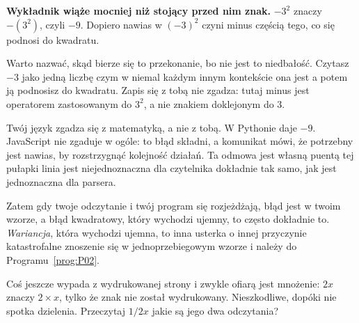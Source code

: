 \begin{fr}
\begin{trapbox}
\textbf{Wykładnik wiąże mocniej niż stojący przed nim znak.} $-3^{2}$ znaczy
$-(3^{2})$, czyli $-9$. Dopiero nawias w $(-3)^{2}$ czyni minus częścią tego,
co się podnosi do kwadratu.

Warto nazwać, skąd bierze się to przekonanie, bo nie jest to niedbałość.
Czytasz $-3$ jako jedną liczbę \dash{} czym w niemal każdym innym kontekście
ona jest \dash{} a potem ją podnosisz do kwadratu. Zapis się z tobą nie zgadza:
tutaj minus jest operatorem zastosowanym do $3^{2}$, a nie znakiem doklejonym
do $3$.

Twój język zgadza się z matematyką, a nie z tobą. W Pythonie  daje
$-9$. JavaScript nie zgaduje w ogóle:  to błąd składni, a
komunikat mówi, że potrzebny jest nawias, by rozstrzygnąć kolejność działań. Ta
odmowa jest własną puentą tej pułapki \dash{} linia jest niejednoznaczna dla
czytelnika dokładnie tak samo, jak jest jednoznaczna dla parsera.

Zatem gdy twoje odczytanie i twój program się rozjeżdżają, błąd jest w twoim
wzorze, a błąd kwadratowy, który wychodzi ujemny, to często dokładnie
to. \emph{Wariancja}, która wychodzi ujemna, to inna usterka o innej
przyczynie \dash{} katastrofalne znoszenie się w jednoprzebiegowym wzorze
\dash{} i należy do Programu~\ref{prog:P02}.
\end{trapbox}
Coś jeszcze wypada z wydrukowanej strony i zwykle ofiarą jest mnożenie: $2x$
znaczy $2 \times x$, tylko że znak nie został wydrukowany. Nieszkodliwe,
dopóki nie spotka dzielenia. Przeczytaj $1/2x$ \dash{} jakie są jego dwa
odczytania?
\nextframe
\end{fr}

